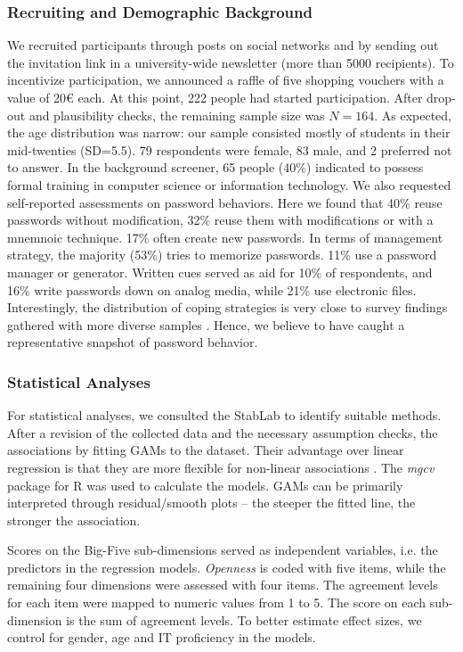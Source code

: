 \subsubsection{Recruiting and Demographic Background}
We recruited participants through posts on social networks and by sending out the invitation link in a university-wide newsletter (more than 5000 recipients). To incentivize participation, we announced a raffle of five shopping vouchers with a value of 20€ each. At this point, 222 people had started participation. After drop-out and plausibility checks, the remaining sample size was $N=164$. As expected, the age distribution was narrow: our sample consisted mostly of students in their mid-twenties  (SD=5.5). 79 respondents were female, 83 male, and 2 preferred not to answer. In the background screener, 65 people (40\%) indicated to possess formal training in computer science or information technology. We also requested self-reported assessments on password behaviors. Here we found that 40\% reuse passwords without modification, 32\% reuse them with modifications or with a mnemnoic technique. 17\% often create new passwords. In terms of management strategy, the majority (53\%) tries to memorize passwords. 11\% use a password manager or generator. Written cues served as aid for 10\% of respondents, and 16\% write passwords down on analog media, while 21\% use electronic files. Interestingly, the distribution of coping strategies is very close to survey findings gathered with more diverse samples \cite{CSID2012PasswordHabits}. Hence, we believe to have caught a representative snapshot of password behavior.

\subsubsection{Statistical Analyses}
For statistical analyses, we consulted the StabLab to identify suitable methods. After a revision of the collected data and the necessary assumption checks, the associations by fitting \gls{GAM}s to the dataset. Their advantage over linear regression is that they are more flexible for non-linear associations . The \textit{mgcv} package for R was used to calculate the models. GAMs can be primarily interpreted through residual/smooth plots -- the steeper the fitted line, the stronger the association.

Scores on the Big-Five sub-dimensions served as independent variables, i.e. the predictors in the regression models. \textit{Openness} is coded with five items, while the remaining four dimensions were assessed with four items. The agreement levels for each item were mapped to numeric values from 1 to 5. The score on each sub-dimension is the sum of agreement levels. To better estimate effect sizes, we control for gender, age and IT proficiency in the models. 

